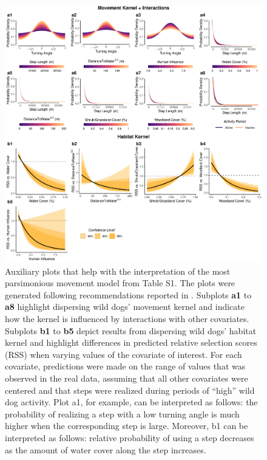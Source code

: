 \documentclass[abstract=off,10pt,a4paper,bibliography=totocnumbered]{article}
\begin{document}
\begin{figure}[hbtp]
  \begin{center}
    \includegraphics[width = \textwidth]{99_MovementModelInterpretation.png}
    \caption{Auxiliary plots that help with the interpretation of the most
    parsimonious movement model from Table S1. The plots were generated
    following recommendations reported in \cite{Fieberg.2020}. Subplots
    \textbf{a1} to \textbf{a8} highlight dispersing wild dogs' movement kernel
    and indicate how the kernel is influenced by interactions with other
    covariates. Subplots \textbf{b1} to \textbf{b5} depict results from
    dispersing wild dogs' habitat kernel and highlight differences in predicted
    relative selection scores (RSS) when varying values of the covariate of
    interest. For each covariate, predictions were made on the range of values
    that was observed in the real data, assuming that all other covariates were
    centered and that steps were realized during periods of ``high'' wild dog
    activity. Plot a1, for example, can be interpreted as follows: the
    probability of realizing a step with a low turning angle is much higher when
    the corresponding step is large. Moreover, b1 can be interpreted as follows:
    relative probability of using a step decreases as the amount of water cover
    along the step increases.}
    \label{Interpretation}
  \end{center}
\end{figure}
\end{document}
